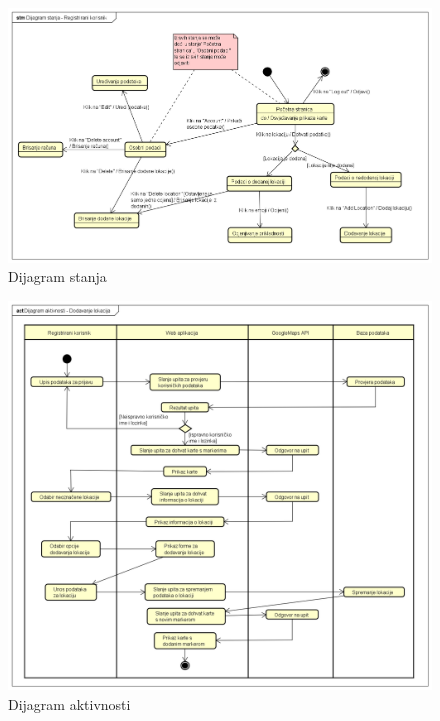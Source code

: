 			\begin{figure}[H]
			\includegraphics[scale=0.2]{slike/DijagramStanja.png}
			\centering
			\caption{Dijagram stanja}
			\label{fig:promjene}
				\end{figure}
			
			\begin{figure}[H]
			\includegraphics[scale=0.2]{slike/DijagramAktivnosti.png}
			\centering
			\caption{Dijagram aktivnosti}
			\label{fig:promjene}
				\end{figure}

